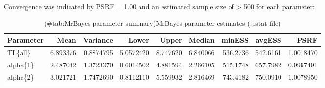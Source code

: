 \documentclass[]{book}
\theoremstyle{definition}
\theoremstyle{definition}
\theoremstyle{definition}
\theoremstyle{remark}
\begin{document}
Convergence was indicated by PSRF = 1.00 and an estimated sample size of
\textgreater{} 500 for each parameter:

\begin{table}

\caption{(\#tab:MrBayes parameter summary)MrBayes parameter estimates (.pstat file)}
\centering
\begin{tabular}[t]{l|r|r|r|r|r|r|r|r}
\hline
Parameter & Mean & Variance & Lower & Upper & Median & minESS & avgESS & PSRF\\
\hline
TL\{all\} & 6.893376 & 0.8874795 & 5.0572420 & 8.747620 & 6.840066 & 536.2736 & 542.6161 & 1.0018470\\
\hline
alpha\{1\} & 2.487032 & 1.3723370 & 0.6014502 & 4.881594 & 2.266105 & 515.1748 & 657.7982 & 0.9997491\\
\hline
alpha\{2\} & 3.021721 & 1.7472690 & 0.8112110 & 5.559932 & 2.816469 & 743.4182 & 750.0910 & 1.0078950\\
\hline
\end{tabular}
\end{table}


\end{document}
